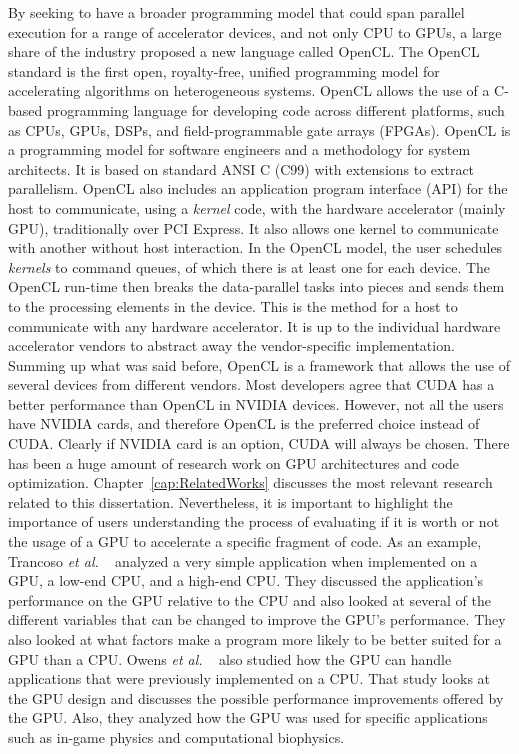 \documentclass[Ingles]{ic-tese-v1}
\newcommand{\etal}{{\em et al. }}
\newcommand{\rcap}[1]{Chapter~\ref{cap:#1}}
\newcommand{\tit}[1]{{\textit{#1}}}
\begin{document}
By seeking to have a  broader  programming model that could  span parallel execution
for a range of accelerator devices, and not only CPU to GPUs, a large share of
the industry proposed a new language called OpenCL. The OpenCL
standard is the first open, royalty-free, unified programming model for
accelerating algorithms on heterogeneous systems. OpenCL allows the use of a
C-based programming language for developing code across different platforms,
such as CPUs, GPUs, DSPs, and field-programmable gate arrays (FPGAs).  OpenCL
is a programming model for software engineers and a methodology for system
architects. It is based on standard ANSI C (C99) with extensions to extract
parallelism. OpenCL also includes an application program interface (API) for
the host to communicate, using a \tit{kernel} code, with the hardware accelerator (mainly GPU),
traditionally over PCI Express. It also allows one kernel to communicate with another
without host interaction.  In the OpenCL model, the user schedules \tit{kernels} to
command queues, of which there is at least one for each device. The OpenCL
run-time then breaks the data-parallel tasks into pieces and sends them to the
processing elements in the device. This is the method for a host to communicate
with any hardware accelerator. It is up to the individual hardware accelerator
vendors to abstract away the vendor-specific implementation.  Summing up what
was said before, OpenCL is a framework that allows the use of several devices
from different vendors. Most developers agree that CUDA has a better
performance than OpenCL in NVIDIA devices. However, not all the users have
NVIDIA cards, and  therefore OpenCL is the preferred choice  instead of CUDA.
Clearly if NVIDIA card is an option, CUDA will always be chosen.
There has been a huge amount of research work on GPU architectures and code
optimization. \rcap{RelatedWorks} discusses the most relevant  research related to this
dissertation. Nevertheless, it is important to highlight the importance of users understanding the process of evaluating  if it is worth or not the usage of a GPU to accelerate a specific
fragment of code.
As an example, Trancoso \etal~\cite{Trancoso2005} analyzed a very simple
application when implemented on a GPU, a low-end CPU, and a high-end CPU. They
discussed the application’s performance on the GPU relative to the CPU and also
looked at several of the different variables that can be changed to improve the
GPU’s performance. They also looked at what factors make a program more likely
to be better suited for a GPU than a CPU. Owens
\etal~\cite{Owens2008} also studied how the GPU can handle applications that
were previously implemented on a CPU. That study looks at the GPU design and
discusses the possible performance improvements offered by the GPU. Also,
they analyzed how the GPU was used for specific applications such as in-game
physics and computational biophysics.
\end{document}
